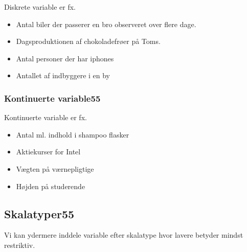 \documentclass[]{book}
\providecommand{\tightlist}{%
  \setlength{\itemsep}{0pt}\setlength{\parskip}{0pt}}
\theoremstyle{definition}
\theoremstyle{definition}
\theoremstyle{definition}
\theoremstyle{remark}
\begin{document}
Diskrete variable er fx.

\begin{itemize}
\tightlist
\item
  Antal biler der passerer en bro observeret over flere dage.
\item
  Dagsproduktionen af chokoladefrøer på Toms. 
\item
  Antal personer der har iphones
\item
  Antallet af indbyggere i en by
\end{itemize}

\hypertarget{kontinuerte-variable55}{%
\subsubsection{Kontinuerte variable55}\label{kontinuerte-variable55}}

Kontinuerte variable er fx.

\begin{itemize}
\tightlist
\item
  Antal ml. indhold i shampoo flasker
\item
  Aktiekurser for Intel
\item
  Vægten på værnepligtige
\item
  Højden på studerende
\end{itemize}

\hypertarget{skalatyper55}{%
\subsection{Skalatyper55}\label{skalatyper55}}

Vi kan ydermere inddele variable efter skalatype hvor lavere betyder
mindst restriktiv.
\end{document}
